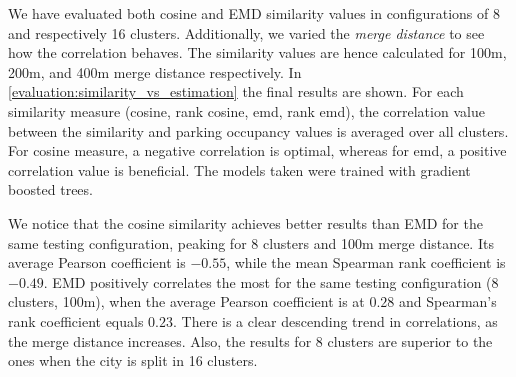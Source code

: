 We have evaluated both cosine and EMD similarity values in configurations of 8 and respectively 16 clusters.
Additionally, we varied the \textit{merge distance} to see how the correlation behaves.
The similarity values are hence calculated for 100m, 200m, and 400m merge distance respectively.
In \ref{evaluation:similarity_vs_estimation} the final results are shown.
For each similarity measure (cosine, rank cosine, emd, rank emd), the correlation value between the similarity and parking occupancy values is averaged over all clusters. For cosine measure, a negative correlation is optimal, whereas for emd, a positive correlation value is beneficial. The models taken were trained with gradient boosted trees. 
	
We notice that the cosine similarity achieves better results than EMD for the same testing configuration, peaking for 8 clusters and 100m merge distance.
Its average Pearson coefficient is $-0.55$, while the mean Spearman rank coefficient is $-0.49$.
EMD positively correlates the most for the same testing configuration (8 clusters, 100m), when the average Pearson coefficient is at $0.28$ and Spearman's rank coefficient equals $0.23$.
There is a clear descending trend in correlations, as the merge distance increases.  Also, the results for 8 clusters are superior to the ones when the city is split in 16 clusters.

